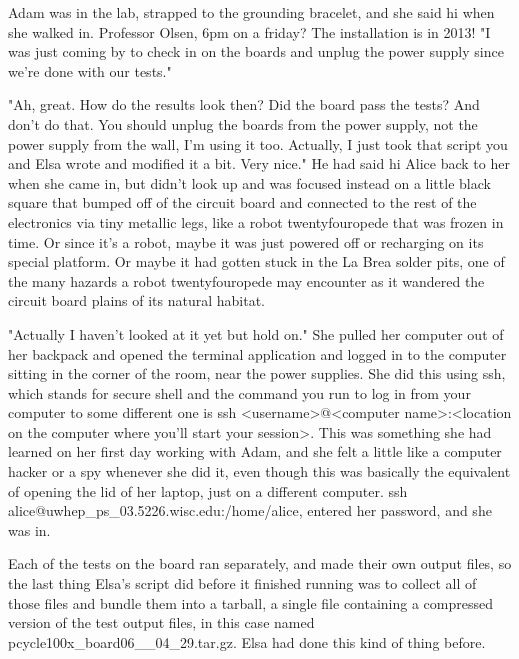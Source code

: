 Adam was in the lab, strapped to the grounding bracelet, and she said hi when she walked in. Professor Olsen, 6pm on a friday? The installation is in 2013! "I was just coming by to check in on the boards and unplug the power supply since we're done with our tests."

"Ah, great. How do the results look then? Did the board pass the tests? And don't do that. You should unplug the boards from the power supply, not the power supply from the wall, I'm using it too. Actually, I just took that script you and Elsa wrote and modified it a bit. Very nice." He had said hi Alice back to her when she came in, but didn't look up and was focused instead on a little black square that bumped off of the circuit board and connected to the rest of the electronics via tiny metallic legs, like a robot twentyfouropede that was frozen in time. Or since it's a robot, maybe it was just powered off or recharging on its special platform. Or maybe it had gotten stuck in the La Brea solder pits, one of the many hazards a robot twentyfouropede may encounter as it wandered the circuit board plains of its natural habitat. 

"Actually I haven't looked at it yet but hold on." She pulled her computer out of her backpack and opened the terminal application and logged in to the computer sitting in the corner of the room, near the power supplies. She did this using ssh, which stands for secure shell and the command you run to log in from your computer to some different one is {\ttfamily ssh <username>@<computer name>:<location on the computer where you'll start your session>}. This was something she had learned on her first day working with Adam, and she felt a little like a computer hacker or a spy whenever she did it, even though this was basically the equivalent of opening the lid of her laptop, just on a different computer. {\ttfamily ssh alice\-@uwhep\_ps\_03\-.5226.wisc.edu:\-/home/alice}, entered her password, and she was in.

Each of the tests on the board ran separately, and made their own output files, so the last thing Elsa's script did before it finished running was to collect all of those files and bundle them into a tarball, a single file containing a compressed version of the test output files, in this case named {\ttfamily pcycle100x\_\-board06\_\_04\_29.tar.gz}. Elsa had done this kind of thing before. 

